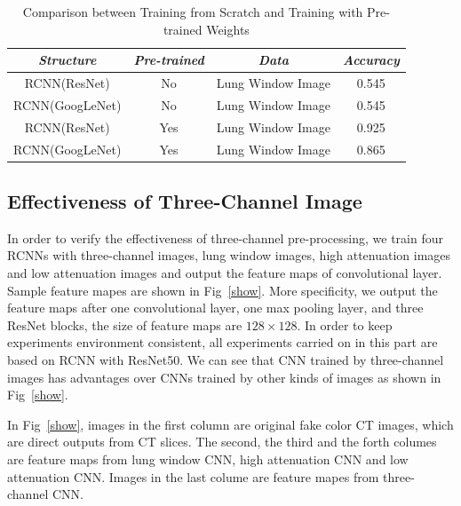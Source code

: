 \begin{table}[htb]
\vspace{-0cm}
\caption{Comparison between Training from Scratch and Training with Pre-trained Weights}
\vspace{-0cm}
\begin{center}
    \begin{tabular}{|c|c|c|c|}
    \hline
    \textbf{\textit{Structure}} & \textbf{\textit{Pre-trained}} & \textbf{\textit{Data}}& \textbf{\textit{Accuracy}}  \\
    \hline
    RCNN(ResNet) &No & Lung Window Image & 0.545\\
    RCNN(GoogLeNet) & No & Lung Window Image & 0.545\\
    RCNN(ResNet) & Yes & Lung Window Image & 0.925\\
    RCNN(GoogLeNet) & Yes & Lung Window Image & 0.865\\
    
    \hline
    \end{tabular}
\vspace{-0cm}
\label{pretrain}
\end{center}
\vspace{-0cm}
\end{table}



\subsection{Effectiveness of Three-Channel Image}
\label{effectiveness}
In order to verify the effectiveness of three-channel pre-processing, we train four RCNNs with three-channel images, lung window images, high attenuation images and low attenuation images and output the feature maps of convolutional layer. Sample feature mapes are shown in Fig~\ref{show}. More specificity, we output the feature maps after one convolutional layer, one max pooling layer, and three ResNet blocks, the size of feature maps are $128 \times 128$. In order to keep experiments environment consistent, all experiments carried on in this part are based on RCNN with ResNet50. We can see that CNN trained by three-channel images has advantages over CNNs trained by other kinds of images as shown in Fig~\ref{show}. 

In Fig~\ref{show}, images in the first column are original fake color CT images, which are direct outputs from CT slices. The second, the third and the forth columes are feature maps from lung window CNN, high attenuation CNN and low attenuation CNN. Images in the last colume are feature mapes from three-channel CNN.

